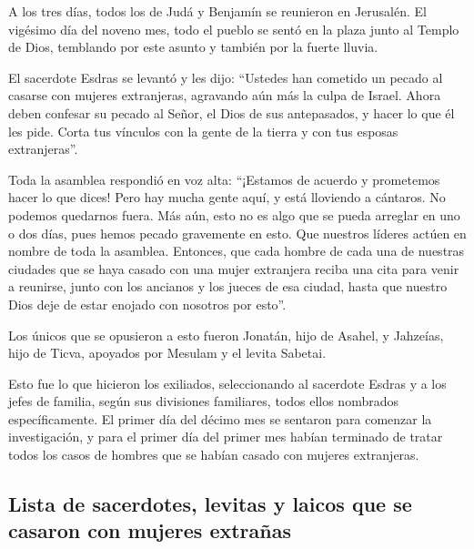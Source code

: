  A los tres días, todos los de Judá y Benjamín se
reunieron en Jerusalén. El vigésimo día del noveno mes, todo el pueblo
se sentó en la plaza junto al Templo de Dios, temblando por este asunto
y también por la fuerte lluvia.

 El sacerdote Esdras se levantó y les dijo: ``Ustedes han
cometido un pecado al casarse con mujeres extranjeras, agravando aún más
la culpa de Israel.  Ahora deben confesar su pecado al
Señor, el Dios de sus antepasados, y hacer lo que él les pide. Corta tus
vínculos con la gente de la tierra y con tus esposas extranjeras''.

 Toda la asamblea respondió en voz alta: ``¡Estamos de
acuerdo y prometemos hacer lo que dices!  Pero hay mucha
gente aquí, y está lloviendo a cántaros. No podemos quedarnos fuera. Más
aún, esto no es algo que se pueda arreglar en uno o dos días, pues hemos
pecado gravemente en esto.  Que nuestros líderes actúen
en nombre de toda la asamblea. Entonces, que cada hombre de cada una de
nuestras ciudades que se haya casado con una mujer extranjera reciba una
cita para venir a reunirse, junto con los ancianos y los jueces de esa
ciudad, hasta que nuestro Dios deje de estar enojado con nosotros por
esto''.

 Los únicos que se opusieron a esto fueron Jonatán, hijo
de Asahel, y Jahzeías, hijo de Ticva, apoyados por Mesulam y el levita
Sabetai.

 Esto fue lo que hicieron los exiliados, seleccionando al
sacerdote Esdras y a los jefes de familia, según sus divisiones
familiares, todos ellos nombrados específicamente. El primer día del
décimo mes se sentaron para comenzar la investigación,  y
para el primer día del primer mes habían terminado de tratar todos los
casos de hombres que se habían casado con mujeres extranjeras.

\hypertarget{lista-de-sacerdotes-levitas-y-laicos-que-se-casaron-con-mujeres-extrauxf1as}{%
\subsection{Lista de sacerdotes, levitas y laicos que se casaron con
mujeres
extrañas}\label{lista-de-sacerdotes-levitas-y-laicos-que-se-casaron-con-mujeres-extrauxf1as}}

